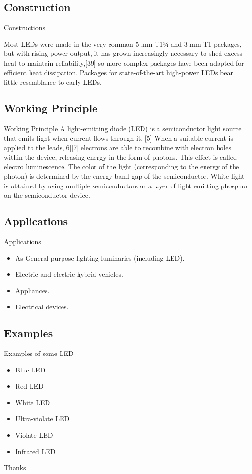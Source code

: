 \documentclass{beamer}
\begin{document}
\subsection{Construction}

\begin{frame}{Constructions}

Most LEDs were made in the very common 5 mm T1¾ and 3 mm T1 packages, but with rising power output, it has grown increasingly necessary to shed excess heat to maintain reliability,[39] so more complex packages have been adapted for efficient heat dissipation. Packages for state-of-the-art high-power LEDs bear little resemblance to early LEDs.
\end{frame}
\subsection{Working Principle}
\begin{frame}{Working Principle}
A light-emitting diode (LED) is a semiconductor light source that emits light when current flows through it. [5] When a suitable current is applied to the leads,[6][7] electrons are able to recombine with electron holes within the device, releasing energy in the form of photons. This effect is called electro luminescence. The color of the light (corresponding to the energy of the photon) is determined by the energy band gap of the semiconductor. White light is obtained by using multiple semiconductors or a layer of light emitting phosphor on the semiconductor device.
\end{frame}
\subsection{Applications}
\begin{frame}{Applications}
\begin{itemize}
	\item As General purpose lighting luminaries (including LED).
	\item Electric and electric hybrid vehicles.
	\item Appliances.
	\item Electrical devices.
\end{itemize}
\end{frame}
\subsection{Examples}
\begin{frame}{Examples of some LED}
	\begin{itemize}
		\item{Blue LED}
		\item{Red LED}
		\item{White LED}
		\item{Ultra-violate LED}
		\item{Violate LED}
		\item{Infrared LED}
	\end{itemize}
\end{frame}
\begin{frame}
\centering
	\color{blue}Thanks
\end{frame}
\end{document}

